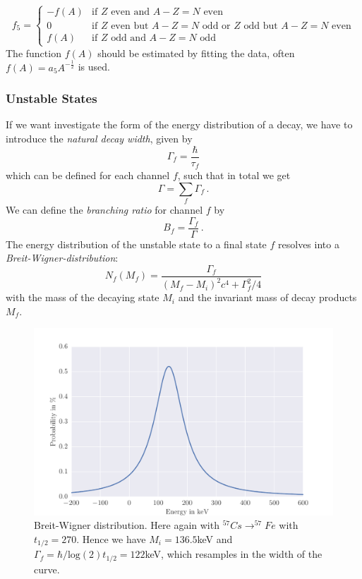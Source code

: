 \begin{itemize}
      \begin{equation}
          f_5   =
          \begin{cases}
              -f(A) & \text{if $Z$ even and $A-Z=N$ even}\\
              0     & \text{if $Z$ even but $A-Z=N$ odd or $Z$ odd but $A-Z=N$ even}\\
              f(A)  & \text{if $Z$ odd and $A-Z=N$ odd}
          \end{cases}
          \label{eq:pair}
      \end{equation}
      The function $f(A)$ should be estimated by fitting the data, 
      often $f(A) = a_5 A^{-\frac{1}{2}}$ is used.
\end{itemize}

\subsubsection{Unstable States}
\label{ssub:Unstable States}
If we want investigate the form of the energy distribution of a decay, we have to 
introduce the \emph{natural decay width}, given by
\begin{equation}
    \Gamma_f = \frac{\hbar}{\tau_f} 
\end{equation}
which can be defined for each channel $f$, such that in total we get
\begin{equation}
    \Gamma = \sum_{f} \Gamma_f \, .
\end{equation}
We can define the \emph{branching ratio} for channel $f$ by
\begin{equation}
    B_f = \frac{\Gamma_f}{\Gamma} \, .
\end{equation}
The energy distribution of the unstable state to a final state $f$ resolves into a 
\emph{Breit-Wigner-distribution}: 
\begin{equation}
    N_f(M_f) = \frac{\Gamma_f}{(M_f-M_i)^2 c^4 + \Gamma_f^2/4}
\end{equation}
with the mass of the decaying state $M_i$ and the invariant mass of decay products $M_f$.
\begin{figure}[htpb]
    \centering
    \includegraphics[width=0.9\linewidth]{analysis/figures/breit_wigner}
    \caption{Breit-Wigner distribution. Here again with
        $^{57}Cs\rightarrow ^{57}Fe$ with $t_{1/2}=270$. Hence we have $M_i = 136.5$keV and
    $\Gamma_f = \hbar / \textrm{log}(2)t_{1/2} = 122$keV, which resamples in the width of the curve.}
    \label{fig:name}
\end{figure}
\clearpage

